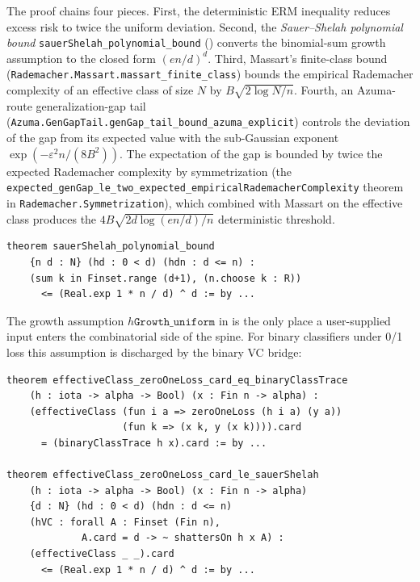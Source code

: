 \documentclass[sigplan,anonymous,review,screen]{acmart}
\begin{document}
The proof chains four pieces. First, the deterministic ERM inequality
reduces excess risk to twice the uniform deviation. Second, the
\emph{Sauer--Shelah polynomial bound}
\texttt{sauerShelah\_polynomial\_bound}
() converts the binomial-sum growth assumption to
the closed form $(en/d)^d$. Third, Massart's finite-class bound
(\texttt{Rademacher.Massart.massart\_finite\_class}) bounds the empirical
Rademacher complexity of an effective class of size $N$ by
$B\sqrt{2 \log N / n}$. Fourth, an Azuma-route generalization-gap tail
(\texttt{Azuma.GenGapTail.}\allowbreak\texttt{genGap\_tail\_bound\_azuma\_explicit})
controls the deviation of the gap from its expected value with the
sub-Gaussian exponent $\exp(-\varepsilon^2 n / (8 B^2))$. The
expectation of the gap is bounded by twice the expected Rademacher
complexity by symmetrization (the
\texttt{expected\_genGap\_le\_two}\allowbreak\texttt{\_expected\_empiricalRademacherComplexity}
theorem in \texttt{Rademacher.Symmetrization}), which combined with
Massart on the effective class produces the
$4B\sqrt{2 d \log(en/d)/n}$ deterministic threshold.

\begin{lstlisting}[caption={Sauer--Shelah polynomial bound
                  (\texttt{FormalSLT/VC/SauerShelah.lean:44}).},
                  label={lst:sauer-shelah}]
theorem sauerShelah_polynomial_bound
    {n d : N} (hd : 0 < d) (hdn : d <= n) :
    (sum k in Finset.range (d+1), (n.choose k : R))
      <= (Real.exp 1 * n / d) ^ d := by ...
\end{lstlisting}

The growth assumption $h\texttt{Growth\_uniform}$ in
 is the only place a user-supplied input enters the
combinatorial side of the spine. For binary classifiers under 0/1 loss
this assumption is discharged by the binary VC bridge:

\begin{lstlisting}[caption={Binary VC bridge: equality of effective
                  loss-pattern class and binary trace
                  (\texttt{FormalSLT/VC/BinaryVCBridge.lean:137}).},
                  label={lst:binary-vc}]
theorem effectiveClass_zeroOneLoss_card_eq_binaryClassTrace
    (h : iota -> alpha -> Bool) (x : Fin n -> alpha) :
    (effectiveClass (fun i a => zeroOneLoss (h i a) (y a))
                    (fun k => (x k, y (x k)))).card
      = (binaryClassTrace h x).card := by ...

theorem effectiveClass_zeroOneLoss_card_le_sauerShelah
    (h : iota -> alpha -> Bool) (x : Fin n -> alpha)
    {d : N} (hd : 0 < d) (hdn : d <= n)
    (hVC : forall A : Finset (Fin n),
             A.card = d -> ~ shattersOn h x A) :
    (effectiveClass _ _).card
      <= (Real.exp 1 * n / d) ^ d := by ...
\end{lstlisting}
\end{document}

